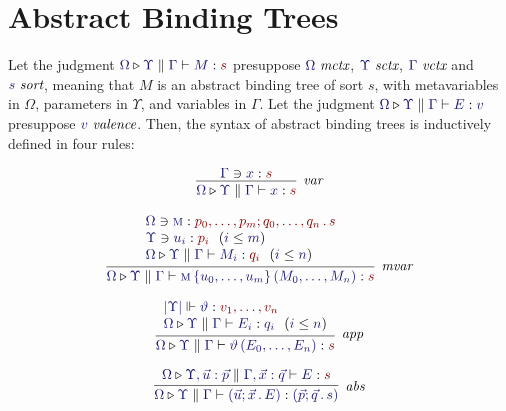 \documentclass[11pt]{article}
\theoremstyle{definition}
\theoremstyle{remark}
\numberwithin{equation}{section}
\def\IModeColorName{MidnightBlue}
\def\OModeColorName{Maroon}
\newcommand\IMode[1]{{\color{\IModeColorName}{#1}}}
\newcommand\OMode[1]{{\color{\OModeColorName}{#1}}}
\newcommand\HypJ[2]{#1\ \ (#2)}
\newcommand\MkValence[3]{#1;#2\,.\, #3}
\newcommand\MkBTm[3]{#1;#2\,.\, #3}
\newcommand\IsValence[1]{\IMode{#1}\ \textit{valence}}
\newcommand\IsSort[1]{\IMode{#1}\ \textit{sort}}
\newcommand\Leq[2]{\IMode{#1}\leq\IMode{#2}}
\newcommand\IsOperator[3]{\IMode{#1}\Vdash \IMode{#2} : \OMode{#3}}
\newcommand\IsMetaCtx[1]{\IMode{#1}\ \textit{mctx}}
\newcommand\IsVarCtx[1]{\IMode{#1}\ \textit{vctx}}
\newcommand\IsSymCtx[1]{\IMode{#1}\ \textit{sctx}}
\newcommand\Lookup[3]{\IMode{#1}\ni\IMode{#2}:\OMode{#3}}
\newcommand\IsAbt[5]{%
  \IMode{#1}\triangleright%
  \IMode{#2}\parallel%
  \IMode{#3}\vdash%
  \IMode{#4}:\OMode{#5}%
}
\newcommand\IsBTm[5]{%
  \IMode{#1}\triangleright%
  \IMode{#2}\parallel%
  \IMode{#3}\vdash%
  \IMode{#4}:\IMode{#5}%
}
\newcommand\MV[1]{\textsc{#1}}
\newcommand\MApp[3]{#1\left\{#2\right\}\left(#3\right)}
\newcommand\App[2]{#1\left(#2\right)}
\newcommand\Dom[1]{\left\vert #1\right\vert}
\begin{document}
\section{Abstract Binding Trees}

Let the judgment $\IsAbt{\Omega}{\Upsilon}{\Gamma}{M}{s}$ presuppose
$\IsMetaCtx{\Omega}$, $\IsSymCtx\Upsilon$, $\IsVarCtx\Gamma$ and $\IsSort{s}$,
meaning that $M$ is an abstract binding tree of sort $s$, with metavariables in
$\Omega$, parameters in $\Upsilon$, and variables in $\Gamma$. Let the judgment
$\IsBTm{\Omega}{\Upsilon}{\Gamma}{E}{v}$ presuppose $\IsValence{v}$.  Then, the
syntax of abstract binding trees is inductively defined in four rules:

\begin{gather*}
  \infer[\textit{var}]{
    \IsAbt{\Omega}{\Upsilon}{\Gamma}{x}{s}
  }{
    \Lookup{\Gamma}{x}{s}
  }\\[6pt]
  \infer[\textit{mvar}]{
    \IsAbt{\Omega}{\Upsilon}{\Gamma}{
      \MApp{\MV{m}}{u_0,\dots,u_m}{M_0,\dots,M_n}
    }{s}
  }{
    \begin{array}{l}
      \Lookup{\Omega}{\MV{m}}{\MkValence{p_0,\dots,p_m}{q_0,\dots,q_n}{s}}\\
      \HypJ{\Lookup{\Upsilon}{u_i}{p_i}}{\Leq{i}{m}}\\
      \HypJ{
        \IsAbt{\Omega}{\Upsilon}{\Gamma}{M_i}{q_i}
      }{
        \Leq{i}{n}
      }
    \end{array}
  }\\[6pt]
  \infer[\textit{app}]{
    \IsAbt{\Omega}{\Upsilon}{\Gamma}{
      \App{\vartheta}{E_0,\dots,E_n}
    }{s}
  }{
    \begin{array}{l}
      \IsOperator{\Dom{\Upsilon}}{\vartheta}{
        v_1,\dots,v_n
      }\\
      \HypJ{
        \IsBTm{\Omega}{\Upsilon}{\Gamma}{E_i}{q_i}
      }{
        \Leq{i}{n}
      }
    \end{array}
  }\\[6pt]
  \infer[\textit{abs}]{
    \IsBTm{\Omega}{\Upsilon}{\Gamma}{
      (\MkBTm{\vec{u}}{\vec{x}}{E})
    }{
      (\MkValence{\vec{p}}{\vec{q}}{s})
    }
  }{
    \IsAbt{\Omega}{\Upsilon, \vec{u}:\vec{p}}{\Gamma,\vec{x}:{\vec{q}}}{
      E
    }{
      s
    }
  }
\end{gather*}
\end{document}
